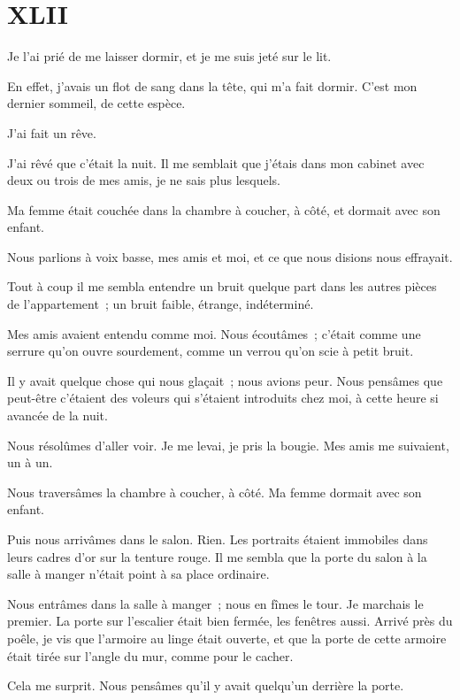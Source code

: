 \documentclass[french,twoside]{book} %
\begin{document}
 \section[{XLII}]{XLII}
\label{ch42}\renewcommand{\leftmark}{XLII}

\noindent Je l’ai prié de me laisser dormir, et je me suis jeté sur le lit.\par
En effet, j’avais un flot de sang dans la tête, qui m’a fait dormir. C’est mon dernier sommeil, de cette espèce.\par
J’ai fait un rêve.\par
J’ai rêvé que c’était la nuit. Il me semblait que j’étais dans mon cabinet avec deux ou trois de mes amis, je ne sais plus lesquels.\par
Ma femme était couchée dans la chambre à coucher, à côté, et dormait avec son enfant.\par
Nous parlions à voix basse, mes amis et moi, et ce que nous disions nous effrayait.\par
Tout à coup il me sembla entendre un bruit quelque part dans les autres pièces de l’appartement ; un bruit faible, étrange, indéterminé.\par
Mes amis avaient entendu comme moi. Nous écoutâmes ; c’était comme une serrure qu’on ouvre sourdement, comme un verrou qu’on scie à petit bruit.\par
 Il y avait quelque chose qui nous glaçait ; nous avions peur. Nous pensâmes que peut-être c’étaient des voleurs qui s’étaient introduits chez moi, à cette heure si avancée de la nuit.\par
Nous résolûmes d’aller voir. Je me levai, je pris la bougie. Mes amis me suivaient, un à un.\par
Nous traversâmes la chambre à coucher, à côté. Ma femme dormait avec son enfant.\par
Puis nous arrivâmes dans le salon. Rien. Les portraits étaient immobiles dans leurs cadres d’or sur la tenture rouge. Il me sembla que la porte du salon à la salle à manger n’était point à sa place ordinaire.\par
Nous entrâmes dans la salle à manger ; nous en fîmes le tour. Je marchais le premier. La porte sur l’escalier était bien fermée, les fenêtres aussi. Arrivé près du poêle, je vis que l’armoire au linge était ouverte, et que la porte de cette armoire était tirée sur l’angle du mur, comme pour le cacher.\par
Cela me surprit. Nous pensâmes qu’il y avait quelqu’un derrière la porte.\par
\end{document}
